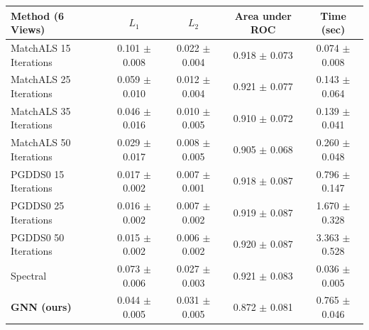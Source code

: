 \documentclass{article} %
\begin{document}
\begin{table}[t]
\begin{center}
\begin{tabular}{|l|c|c|c|c|}
\hline
Method (6 Views)                                     & $L_1$             & $L_2$             & Area under ROC    & Time (sec)        \\
\hline\hline
MatchALS 15 Iterations & 0.101 $\pm$ 0.008 & 0.022 $\pm$ 0.004 & 0.918 $\pm$ 0.073 & 0.074 $\pm$ 0.008 \\ \hline
MatchALS 25 Iterations & 0.059 $\pm$ 0.010 & 0.012 $\pm$ 0.004 & 0.921 $\pm$ 0.077 & 0.143 $\pm$ 0.064 \\ \hline
MatchALS 35 Iterations & 0.046 $\pm$ 0.016 & 0.010 $\pm$ 0.005 & 0.910 $\pm$ 0.072 & 0.139 $\pm$ 0.041 \\ \hline
MatchALS 50 Iterations & 0.029 $\pm$ 0.017 & 0.008 $\pm$ 0.005 & 0.905 $\pm$ 0.068 & 0.260 $\pm$ 0.048 \\ \hline
PGDDS0 15 Iterations   & 0.017 $\pm$ 0.002 & 0.007 $\pm$ 0.001 & 0.918 $\pm$ 0.087 & 0.796 $\pm$ 0.147 \\ \hline
PGDDS0 25 Iterations   & 0.016 $\pm$ 0.002 & 0.007 $\pm$ 0.002 & 0.919 $\pm$ 0.087 & 1.670 $\pm$ 0.328 \\ \hline
PGDDS0 50 Iterations   & 0.015 $\pm$ 0.002 & 0.006 $\pm$ 0.002 & 0.920 $\pm$ 0.087 & 3.363 $\pm$ 0.528 \\ \hline
Spectral               & 0.073 $\pm$ 0.006 & 0.027 $\pm$ 0.003 & 0.921 $\pm$ 0.083 & 0.036 $\pm$ 0.005 \\ \hline
\textbf{GNN (ours)}    & 0.044 $\pm$ 0.005 & 0.031 $\pm$ 0.005 & 0.872 $\pm$ 0.081 & 0.765 $\pm$ 0.046 \\ \hline


\end{tabular}
\end{center}
\end{table}
\end{document}
